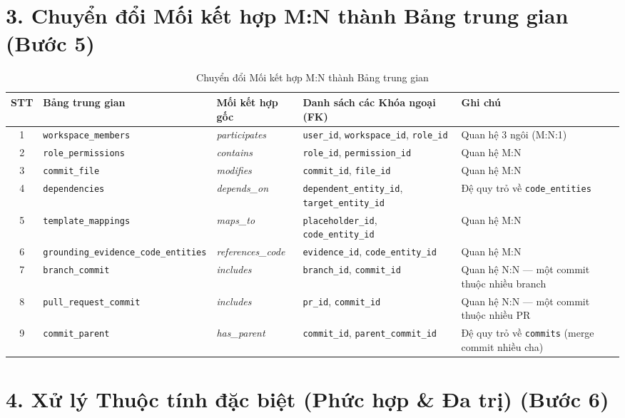 \section*{3. Chuyển đổi Mối kết hợp M:N thành Bảng trung gian (Bước 5)}

\begin{longtable}{|c|p{4cm}|p{2.5cm}|p{3.2cm}|p{3.8cm}|}
\caption{Chuyển đổi Mối kết hợp M:N thành Bảng trung gian} \\
\hline
\textbf{STT} & \textbf{Bảng trung gian} & \textbf{Mối kết hợp gốc} & \textbf{Danh sách các Khóa ngoại (FK)} & \textbf{Ghi chú} \\ \hline
\endhead

1 & \texttt{workspace\_members} & \textit{participates} & \texttt{user\_id}, \texttt{workspace\_id}, \texttt{role\_id} & Quan hệ 3 ngôi (M:N:1) \\ \hline
2 & \texttt{role\_permissions} & \textit{contains} & \texttt{role\_id}, \texttt{permission\_id} & Quan hệ M:N \\ \hline
3 & \texttt{commit\_file} & \textit{modifies} & \texttt{commit\_id}, \texttt{file\_id} & Quan hệ M:N \\ \hline
4 & \texttt{dependencies} & \textit{depends\_on} & \texttt{dependent\_entity\_id}, \texttt{target\_entity\_id} & Đệ quy trỏ về \texttt{code\_entities} \\ \hline
5 & \texttt{template\_mappings} & \textit{maps\_to} & \texttt{placeholder\_id}, \texttt{code\_entity\_id} & Quan hệ M:N \\ \hline
6 & \texttt{grounding\_evidence\_code\_entities} & \textit{references\_code} & \texttt{evidence\_id}, \texttt{code\_entity\_id} & Quan hệ M:N \\ \hline
7 & \texttt{branch\_commit} & \textit{includes} & \texttt{branch\_id}, \texttt{commit\_id} & Quan hệ N:N --- một commit thuộc nhiều branch \\ \hline
8 & \texttt{pull\_request\_commit} & \textit{includes} & \texttt{pr\_id}, \texttt{commit\_id} & Quan hệ N:N --- một commit thuộc nhiều PR \\ \hline
9 & \texttt{commit\_parent} & \textit{has\_parent} & \texttt{commit\_id}, \texttt{parent\_commit\_id} & Đệ quy trỏ về \texttt{commits} (merge commit nhiều cha) \\ \hline
\end{longtable}

\section*{4. Xử lý Thuộc tính đặc biệt (Phức hợp \& Đa trị) (Bước 6)}

